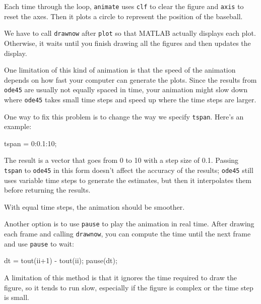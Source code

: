 
Each time through the loop, \lstinline{animate} uses \lstinline{clf}
to clear the figure and \lstinline{axis} to reset the axes.  Then it plots a circle to represent the position of the \mbox{baseball}.


We have to call \lstinline{drawnow} after \lstinline{plot} so
that MATLAB actually displays each plot.  Otherwise, it waits
until you finish drawing all the figures and then updates
the display.

One limitation of this kind of animation is that the speed
of the animation depends on how fast your computer can generate
the plots.  Since the results from \lstinline{ode45} are usually not
equally spaced in time, your animation might slow down where
\lstinline{ode45} takes small time steps and speed up where the time
steps are larger.


One way to fix this problem is to change the way we specify \lstinline{tspan}.
Here's an example:

\begin{code}
    tspan = 0:0.1:10;
\end{code}

The result is a vector that goes from 0 to 10 with a step size of 0.1.
Passing \lstinline{tspan} to \lstinline{ode45} in this form doesn't affect the accuracy of the results;
\lstinline{ode45} still uses variable time steps to generate the estimates, but then it interpolates them before returning the results.


With equal time steps, the animation should be smoother.

Another option is to use \lstinline{pause} to play the animation in
real time.  After drawing each frame and calling
\lstinline{drawnow}, you can compute the time
until the next frame and use \lstinline{pause} to wait:

\begin{code}
    dt = tout(ii+1) - tout(ii);
    pause(dt);
\end{code}

A limitation of this method is that it ignores the time required to
draw the figure, so it tends to run slow, especially if the figure is
complex or the time step is small.


